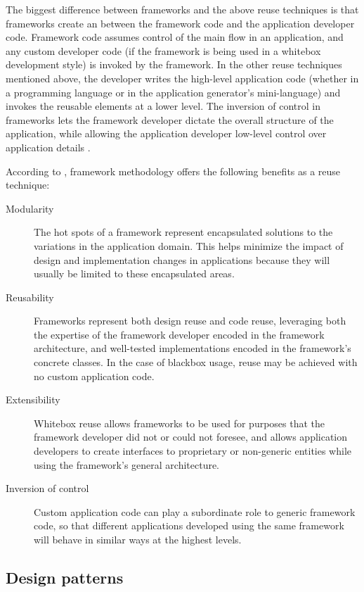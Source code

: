 The biggest difference between frameworks and the above reuse
techniques is that frameworks create an 
between the framework code and the application developer code.
Framework code assumes control of the main flow in an application, and
any custom developer code (if the framework is being used in a
whitebox development style) is invoked by the framework.  In the other
reuse techniques mentioned above, the developer writes the high-level
application code (whether in a programming language or in the
application generator's mini-language) and invokes the reusable
elements at a lower level.  The inversion of control in frameworks
lets the framework developer dictate the overall structure of the
application, while allowing the application developer low-level
control over application details \cite[ch. 1]{fayad:99}.

According to \cite[ch. 1]{fayad:99}, framework methodology offers the
following benefits as a reuse technique:

\begin{description}
\item[Modularity] The hot spots of a framework represent encapsulated
  solutions to the variations in the application domain.  This helps
  minimize the impact of design and implementation changes in
  applications because they will usually be limited to these
  encapsulated areas.
\item[Reusability] Frameworks represent both design reuse and code
  reuse, leveraging both the expertise of the framework developer
  encoded in the framework architecture, and well-tested
  implementations encoded in the framework's concrete classes.  In the
  case of blackbox usage, reuse may be achieved with no custom
  application code.
\item[Extensibility] Whitebox reuse allows frameworks to be used for
  purposes that the framework developer did not or could not foresee,
  and allows application developers to create interfaces to
  proprietary or non-generic entities while using the framework's
  general architecture.
\item[Inversion of control] Custom application code can play a
  subordinate role to generic framework code, so that different
  applications developed using the same framework will behave in
  similar ways at the highest levels.
\end{description}


\subsection{Design patterns}
\label{patterns}

